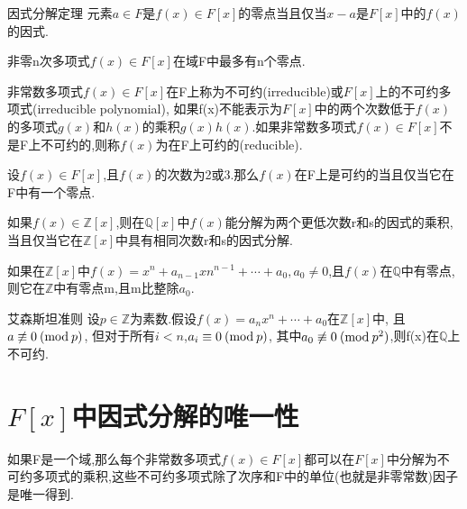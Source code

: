 \documentclass[oneside,openany]{ctexbook}
\begin{document}
\begin{definition}{因式分解定理}{}
元素$a\in F$是$f(x)\in F[x]$的零点当且仅当$x-a$是$F[x]$中的$f(x)$的因式.
\end{definition}

\begin{definition}{}{}
非零n次多项式$f(x)\in F[x]$在域F中最多有n个零点.
\end{definition}

\begin{definition}{}{}
非常数多项式$f(x)\in F[x]$在F上称为不可约\textnormal{(irreducible)}或$F[x]$上的不可约多项式\textnormal{(irreducible polynomial)},
如果f(x)不能表示为$F[x]$中的两个次数低于$f(x)$的多项式$g(x)$和$h(x)$的乘积$g(x)h(x)$.如果非常数多项式$f(x)\in F[x]$不是F上不可约的,则称$f(x)$为在F上可约的\textnormal{(reducible)}.
\end{definition}

\begin{definition}{}{}
设$f(x)\in F[x]$,且$f(x)$的次数为\textnormal{2}或\textnormal{3}.那么$f(x)$在F上是可约的当且仅当它在F中有一个零点.
\end{definition}

\begin{definition}{}{}
如果$f(x)\in \mathbb{Z}[x]$,则在$\mathbb{Q}[x]$中$f(x)$能分解为两个更低次数r和s的因式的乘积,当且仅当它在$\mathbb{Z}[x]$中具有相同次数r和s的因式分解.
\end{definition}

\begin{definition}{}{}
如果在$\mathbb{Z}[x]$中$f(x)=x^n+a_{n-1}xn^{n-1}+\cdots +a_0,a_0\neq 0$,且$f(x)$在$\mathbb{Q}$中有零点,则它在$\mathbb{Z}$中有零点m,且m比整除$a_0$.
\end{definition}

\begin{definition}{艾森斯坦准则}{}
设$p\in \mathbb{Z}为素数$.假设$f(x)=a_nx^n+\cdots +a_0$在$\mathbb{Z}[x]$中,
且$a\not \equiv 0\>(\textnormal{mod}\>p)$,
但对于所有$i<n$,$a_i\equiv 0\>(\textnormal{mod}\>p)$,
其中$a_0\not \equiv 0\>(\textnormal{mod}\>p^2)$,则f(x)在$\mathbb{Q}$上不可约.
\end{definition}

\section{$F[x]$中因式分解的唯一性}

\begin{definition}{}{}
如果F是一个域,那么每个非常数多项式$f(x)\in F[x]$都可以在$F[x]$中分解为不可约多项式的乘积,这些不可约多项式除了次序和F中的单位\textnormal{(也就是非零常数)}因子是唯一得到.
\end{definition}
\end{document}
